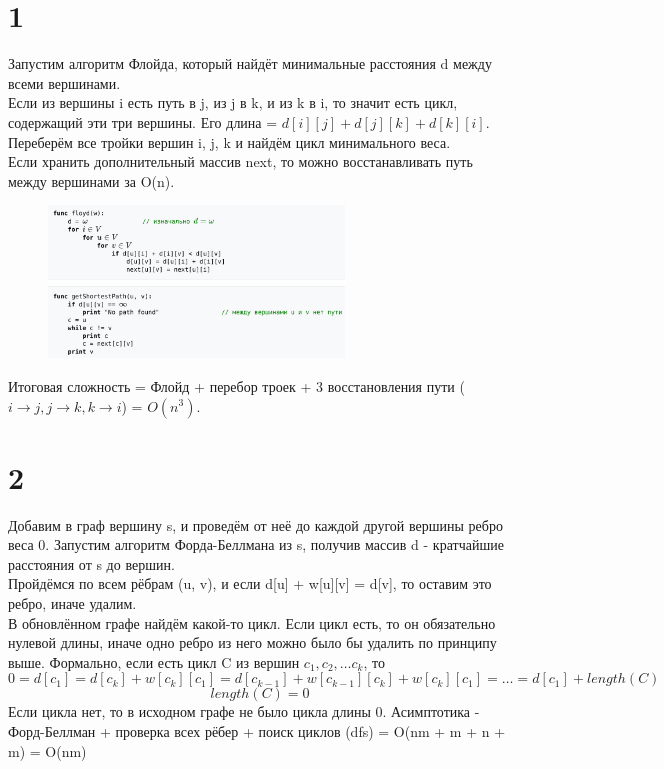 \documentclass[12pt]{extarticle}
\begin{document}
\section*{1}

Запустим алгоритм Флойда, который найдёт минимальные расстояния d между всеми вершинами. \\
Если из вершины i есть путь в j, из j в k, и из k в i, то значит есть цикл, содержащий эти три вершины. Его длина = $d[i][j] + d[j][k] + d[k][i]$. \\
Переберём все тройки вершин i, j, k и найдём цикл минимального веса. \\
Если хранить дополнительный массив next, то можно восстанавливать путь между вершинами за O(n).
\begin{figure}[h]
    \centering
    \includegraphics*[width=0.7\textwidth]{Флойд.png}
\end{figure}
\newline
Итоговая сложность = Флойд + перебор троек + 3 восстановления пути ($i \to j, j \to k, k \to i$) = $O(n^3)$.

\section*{2}
Добавим в граф вершину s, и проведём от неё до каждой другой вершины ребро веса 0. Запустим алгоритм Форда-Беллмана из s, получив массив d - кратчайшие расстояния от s до вершин.\\
Пройдёмся по всем рёбрам (u, v), и если d[u] + w[u][v] = d[v], то оставим это ребро, иначе удалим.\\
В обновлённом графе найдём какой-то цикл. Если цикл есть, то он обязательно нулевой длины, иначе одно ребро из него можно было бы удалить по принципу выше. Формально, если есть цикл C из вершин $c_1, c_2, \dots c_k$, то
\[
    0 = d[c_1] = d[c_k] + w[c_k][c_1] = d[c_{k-1}] + w[c_{k-1}][c_k] + w[c_k][c_1] = \dots = d[c_1] + length(C)
\]
\[
    length(C) = 0
\]
\newline
Если цикла нет, то в исходном графе не было цикла длины 0.
\newline
Асимптотика - Форд-Беллман + проверка всех рёбер + поиск циклов (dfs) = O(nm + m + n + m) = O(nm)
\end{document}
